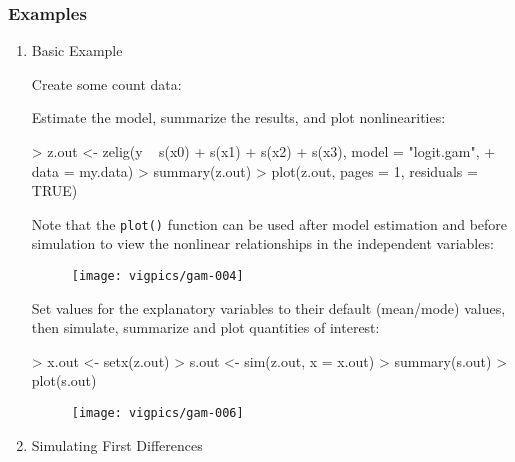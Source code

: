 \subsubsection{Examples}
\begin{enumerate}
\item Basic Example

Create some count data:

\begin{Schunk}
\end{Schunk}

Estimate the model, summarize the results, and plot nonlinearities:

\begin{Schunk}
\begin{Sinput}
> z.out <- zelig(y ~ s(x0) + s(x1) + s(x2) + s(x3), model = "logit.gam", 
+     data = my.data)
> summary(z.out)
> plot(z.out, pages = 1, residuals = TRUE)
\end{Sinput}
\end{Schunk}
Note that the {\tt plot()} function can be used after model estimation and before simulation to view the nonlinear relationships in the independent variables: 

\begin{figure}[here]
\centering
\texttt{[image: vigpics/gam-004]}
\label{fig:plotgam}
\end{figure}

Set values for the explanatory variables to their default (mean/mode) values, then simulate, summarize and plot quantities of interest:
\begin{Schunk}
\begin{Sinput}
> x.out <- setx(z.out)
> s.out <- sim(z.out, x = x.out)
> summary(s.out)
> plot(s.out)
\end{Sinput}
\end{Schunk}

\begin{figure}[here]
\centering
\texttt{[image: vigpics/gam-006]}
\label{fig:plotgam}
\end{figure}

\item Simulating First Differences


\end{enumerate}
